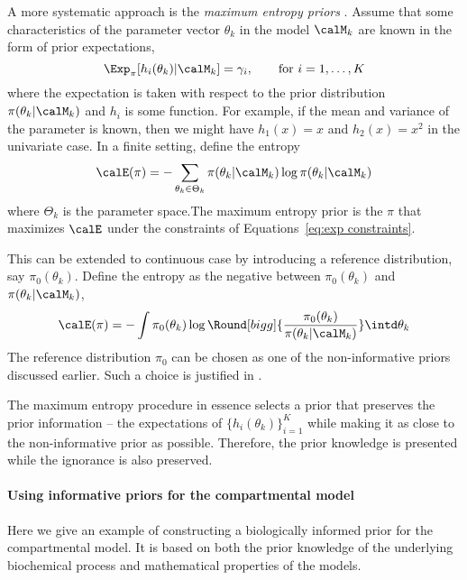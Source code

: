 A more systematic approach is the \emph{maximum entropy priors} \cite{Jaynes:1989vx}. Assume that some characteristics of the parameter vector $\theta_k$ in the model $\calM_k$ are known in the form of prior expectations,
\begin{equation}
  \Exp_{\pi}[h_i(\theta_k)|\calM_k] = \gamma_i, \qquad\text{for } i =
  1,\dots,K
  \label{eq:exp constraints}
\end{equation}
where the expectation is taken with respect to the prior distribution $\pi(\theta_k|\calM_k)$ and $h_i$ is some function. For example, if the mean and variance of the parameter is known, then we might have $h_1(x) = x$ and $h_2(x) = x^2$ in the univariate case. In a finite setting, define the entropy
\begin{equation}
  \calE(\pi) = -\sum_{\theta_k\in\Theta_k}
  \pi(\theta_k|\calM_k)\log \pi (\theta_k|\calM_k)
\end{equation}
where $\Theta_k$ is the parameter space.The maximum entropy prior is the $\pi$ that maximizes $\calE$ under the constraints of Equations~\eqref{eq:exp constraints}.

This can be extended to continuous case by introducing a reference distribution, say $\pi_0(\theta_k)$. Define the entropy as the negative \kld between $\pi_0(\theta_k)$ and $\pi(\theta_k|\calM_k)$,
\begin{equation}
  \calE(\pi) = -\int \pi_0(\theta_k)\log\Round[bigg]{
    \frac{\pi_0(\theta_k)}{\pi(\theta_k|\calM_k)}}\intd\theta_k
\end{equation}
The reference distribution $\pi_0$ can be chosen as one of the non-informative priors discussed earlier. Such a choice is justified in \cite[][chap.~9]{Robert:2007tc}.

The maximum entropy procedure in essence selects a prior that preserves the prior information -- the expectations of $\{h_i(\theta_k)\}_{i=1}^K$ while making it as close to the non-informative prior as possible. Therefore, the prior knowledge is presented while the ignorance is also preserved.

\paragraph{Using informative priors for the \pet compartmental model}

Here we give an example of constructing a biologically informed prior for the \pet compartmental model. It is based on both the prior knowledge of the underlying biochemical process and mathematical properties of the models.


